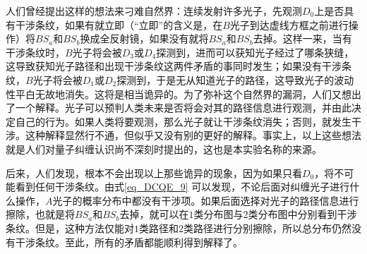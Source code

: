 人们曾经提出这样的想法来刁难自然界：连续发射许多光子，先观测$D_0$上是否具有干涉条纹，如果有就立即（“立即”的含义是，在$B$光子到达虚线方框之前进行操作）将$BS_a$和$BS_b$换成全反射镜，如果没有就将$BS_a$和$BS_b$去掉。这样一来，当有干涉条纹时，$B$光子将会被$D_3$或$D_4$探测到，进而可以获知光子经过了哪条狭缝，这导致获知光子路径和出现干涉条纹这两件矛盾的事同时发生；如果没有干涉条纹，$B$光子将会被$D_1$或$D_2$探测到，于是无从知道光子的路径，这导致光子的波动性平白无故地消失。这将是相当诡异的。为了弥补这个自然界的漏洞，人们又想出了一个解释。光子可以预判人类未来是否将会对其的路径信息进行观测，并由此决定自己的行为。如果人类将要观测，那么光子就让干涉条纹消失；否则，就发生干涉。这种解释显然行不通，但似乎又没有别的更好的解释。事实上，以上这些想法就是人们对量子纠缠认识尚不深刻时提出的，这也是本实验名称的来源。

后来，人们发现，根本不会出现以上那些诡异的现象，因为如果只看$D_0$，将不可能看到任何干涉条纹。由式\autoref{eq_DCQE_9} 可以发现，不论后面对纠缠光子进行什么操作，$A$光子的概率分布中都没有干涉项。如果后面选择对光子的路径信息进行擦除，也就是将$BS_a$和$BS_b$去掉，就可以在$1$类分布图与$2$类分布图中分别看到干涉条纹。但是，这种方法仅能对$1$类路径和$2$类路径进行分别擦除，所以总分布仍然没有干涉条纹。至此，所有的矛盾都能顺利得到解释了。
